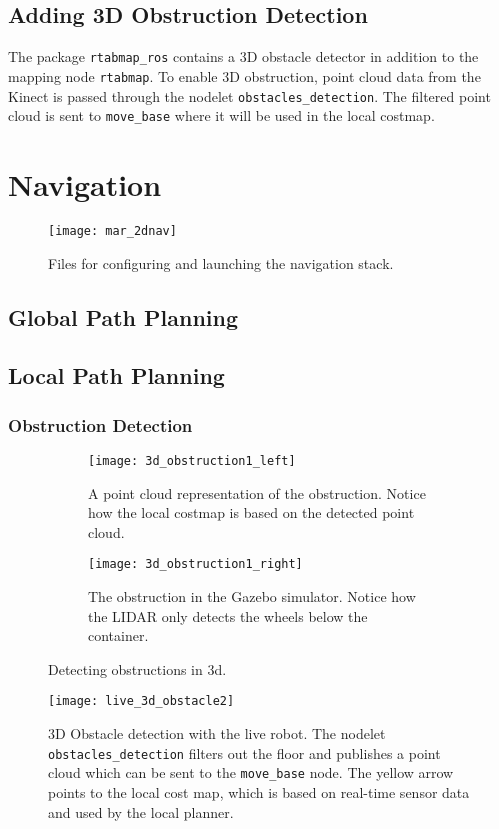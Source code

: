 \subsection{Adding 3D Obstruction Detection}

The package \texttt{rtabmap\_ros} contains a 3D obstacle detector in addition to the mapping node \texttt{rtabmap}. To enable 3D obstruction, point cloud data from the Kinect is passed through the nodelet \texttt{obstacles\_detection}. The filtered point cloud is sent to \texttt{move\_base} where it will be used in the local costmap.

\section{Navigation}



\begin{figure}[h]
	\centering
	\texttt{[image: mar\_2dnav]}
	\caption{Files for configuring and launching the navigation stack.}
	\label{fig:mar_2dnav}
\end{figure}

\subsection{Global Path Planning}

\subsection{Local Path Planning}

\subsubsection{Obstruction Detection}

\begin{figure}
	\centering
	\begin{subfigure}[b]{0.53\textwidth}
		\texttt{[image: 3d\_obstruction1\_left]}
		\caption{A point cloud representation of the obstruction. Notice how the local costmap is based on the detected point cloud.}
		\label{fig:device_select}
	\end{subfigure}
		\begin{subfigure}[b]{0.45\textwidth}
			\texttt{[image: 3d\_obstruction1\_right]}
			\caption{The obstruction in the Gazebo simulator. Notice how the LIDAR only detects the wheels below the container.}
			\label{fig:bt_request}
		\end{subfigure}
	\caption{\label{fig:3d_obstruction1}Detecting obstructions in 3d.}
\end{figure}

\begin{figure}[h]
	\centering
	\texttt{[image: live\_3d\_obstacle2]}
	\caption{3D Obstacle detection with the live robot. The nodelet \texttt{obstacles\_detection} filters out the floor and publishes a point cloud which can be sent to the \texttt{move\_base} node. The yellow arrow points to the local cost map, which is based on real-time sensor data and used by the local planner.}
	\label{fig:live_3d_obstacle2}
\end{figure}